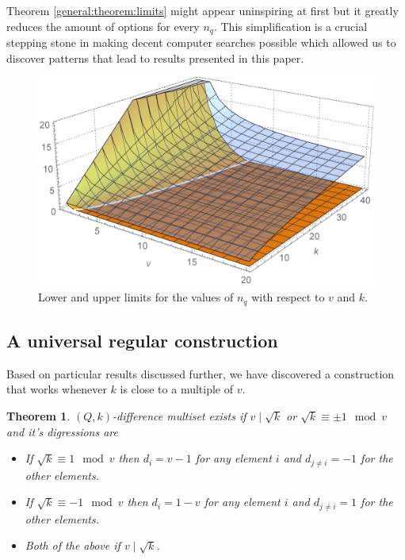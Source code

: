 \documentclass{article}
\theoremstyle{plain}
\newtheorem{theorem}{Theorem}[section]
\theoremstyle{definition}
\theoremstyle{remark}
\begin{document}
            Theorem \ref{general:theorem:limits} might appear uninspiring at first but it greatly reduces the amount of options for every $n_q$. This simplification is a crucial stepping stone in making decent computer searches possible which allowed us to discover patterns that lead to results presented in this paper.
                
            \begin{figure}
                \includegraphics[width=\textwidth]{boundingSurfaces}
                \caption{Lower and upper limits for the values of $n_q$ with respect to $v$ and $k$.}
                \label{general:figure:limits}
            \end{figure}
            
        \subsection{A universal regular construction}
            Based on particular results discussed further, we have discovered a construction that works whenever $k$ is close to a multiple of $v$.
            
            \begin{theorem}
                \label{regular:theorem:regular}
                $(Q,k)$-difference multiset exists if $v \mid \sqrt k$ or $\sqrt k \equiv \pm 1 \mod v$ and it's digressions are 
                    \begin{itemize}
                        \item If $\sqrt k \equiv 1 \mod v$ then $d_i = v-1$ for any element $i$ and $d_{j \neq i} = -1$ for the other elements.
                        \item If $\sqrt k \equiv -1 \mod v$ then $d_i =1-v$ for any element $i$ and $d_{j \neq i} = 1$ for the other elements.
                        \item Both of the above if $v \mid \sqrt k$.
                    \end{itemize}
            \end{theorem}
            
\end{document}
